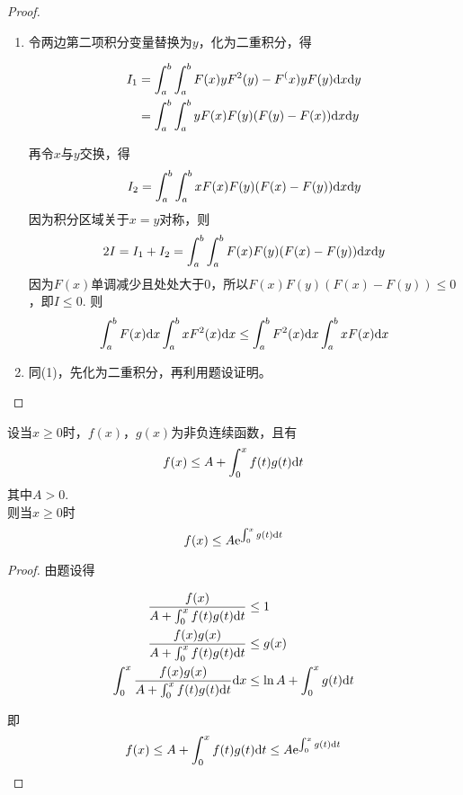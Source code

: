 \begin{proof}
    
    \begin{enumerate}

        \item
            令两边第二项积分变量替换为$y$，化为二重积分，得
        
            \begin{align*}
                I_1 & = \int_{a}^{b}{\int_{a}^{b}{F(x)yF^2(y) - F^(x)yF(y)}\mathrm{d} x}\mathrm{d} y \\
                & = \int_{a}^{b}{\int_{a}^{b}{yF(x)F(y)(F(y) - F(x))}\mathrm{d} x}\mathrm{d} y
            \end{align*}

            再令$x$与$y$交换，得
            \[I_2 = \int_{a}^{b}{\int_{a}^{b}{xF(x)F(y)(F(x) - F(y))}\mathrm{d} x}\mathrm{d} y\]
            因为积分区域关于$x = y$对称，则
            \[2I = I_1 + I_2 = \int_{a}^{b}{\int_{a}^{b}{F(x)F(y)(F(x) - F(y))}\mathrm{d} x}\mathrm{d} y\]
            因为$F(x)$单调减少且处处大于$0$，所以$F(x)F(y)(F(x) - F(y)) \leq 0$，即$I \leq 0$.
            则
            \[ \int_{a}^{b}{F(x)}\mathrm{d} x\int_{a}^{b}{xF^2(x)}\mathrm{d} x \leq \int_{a}^{b}{F^2(x)}\mathrm{d} x \int_{a}^{b}{xF(x)}\mathrm{d} x \]

        \item 同\textup{(1)}，先化为二重积分，再利用题设证明。
        
    \end{enumerate}

\end{proof}

\begin{theorem}

    设当$x \geq 0$时，$f(x)$，$g(x)$为非负连续函数，且有
    \[f(x) \leq A + \int_{0}^{x}{f(t)g(t)}\mathrm{d} t\]
    其中$A > 0$. \\
    则当$x \geq 0$时
    \[ f(x) \leq A \mathrm{e}^{\int_{0}^{x}{g(t)}\mathrm{d} t} \]

\end{theorem}

\begin{proof}

    由题设得

    \begin{align*}
        \dfrac{f(x)}{A + \int_{0}^{x}{f(t)g(t)}\mathrm{d} t} & \leq 1 \\
        \dfrac{f(x)g(x)}{A + \int_{0}^{x}{f(t)g(t)}\mathrm{d} t} & \leq g(x) \\
        \int_{0}^{x}{\dfrac{f(x)g(x)}{A + \int_{0}^{x}{f(t)g(t)}\mathrm{d} t}}\mathrm{d} x & \leq \ln A + \int_{0}^{x}{g(t)}\mathrm{d} t
    \end{align*}

    即
    \[f(x) \leq A+\int_{0}^{x}{f(t)g(t)}\mathrm{d} t \leq A \mathrm{e}^{\int_{0}^{x}{g(t)}\mathrm{d} t} \]

\end{proof}

